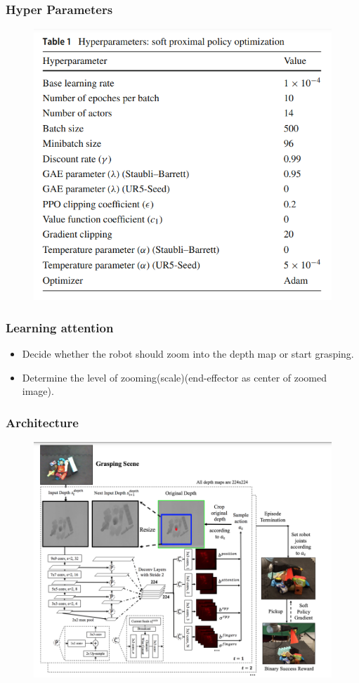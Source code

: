\documentclass{beamer}
\begin{document}
\begin{frame}\frametitle{Hyper Parameters}
\begin{figure}
\includegraphics[width=0.5\linewidth]{hyper_parameters}
\end{figure}
\end{frame}

\begin{frame}\frametitle{Learning attention}
\begin{itemize}
\item Decide whether the robot should zoom into the depth map or start grasping. 
\item Determine the level of zooming(scale)(end-effector as center of zoomed image).
\end{itemize}
\end{frame}

\begin{frame}\frametitle{Architecture}
\begin{figure}
\includegraphics[width=0.8\linewidth]{generAL_architecture}
\end{figure}
\end{frame}
\end{document}
